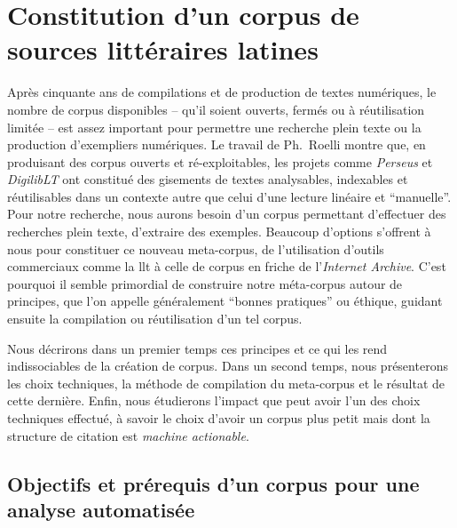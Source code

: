 \section{Constitution d'un corpus de sources littéraires latines}

Après cinquante ans de compilations et de production de textes numériques, le nombre de corpus disponibles -- qu'il soient ouverts, fermés ou à réutilisation limitée -- est assez important pour permettre une recherche plein texte ou la production d'exempliers numériques. Le travail de Ph.~Roelli montre que, en produisant des corpus ouverts et ré-exploitables, les projets comme \textit{Perseus} et \textit{DigilibLT} ont constitué des gisements de textes analysables, indexables et réutilisables dans un contexte autre que celui d'une lecture linéaire et ``manuelle''. Pour notre recherche, nous aurons besoin d'un corpus permettant d'effectuer des recherches plein texte, d'extraire des exemples. Beaucoup d'options s'offrent à nous pour constituer ce nouveau meta-corpus, de l'utilisation d'outils commerciaux comme la \acrshort{llt} à celle de corpus en friche de l'\textit{Internet Archive}. C'est pourquoi il semble primordial de construire notre méta-corpus autour de principes, que l'on appelle généralement \enquote{bonnes pratiques} ou éthique, guidant ensuite la compilation ou réutilisation d'un tel corpus. 

Nous décrirons dans un premier temps ces principes et ce qui les rend indissociables de la création de corpus. Dans un second temps, nous présenterons les choix techniques, la méthode de compilation du meta-corpus et le résultat de cette dernière. Enfin, nous étudierons l'impact que peut avoir l'un des choix techniques effectué, à savoir le choix d'avoir un corpus plus petit mais dont la structure de citation est \textit{machine actionable}.


\subsection{Objectifs et prérequis d'un corpus pour une analyse automatisée}

